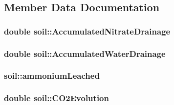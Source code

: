 \subsection{Member Data Documentation}
\hypertarget{classsoil_a92ba9cb92d2aebff24c21437ced70017}{
\subsubsection[{AccumulatedNitrateDrainage}]{\setlength{\rightskip}{0pt plus 5cm}double {\bf soil::AccumulatedNitrateDrainage}}}
\label{classsoil_a92ba9cb92d2aebff24c21437ced70017}
\hypertarget{classsoil_a8f203b5b85e7a616745ae8ec50e7f40d}{
\subsubsection[{AccumulatedWaterDrainage}]{\setlength{\rightskip}{0pt plus 5cm}double {\bf soil::AccumulatedWaterDrainage}}}
\label{classsoil_a8f203b5b85e7a616745ae8ec50e7f40d}
\hypertarget{classsoil_ad38099a7fb0f61aa85c082b4aa0ed931}{
\subsubsection[{ammoniumLeached}]{ {\bf soil::ammoniumLeached}}}
\label{classsoil_ad38099a7fb0f61aa85c082b4aa0ed931}
\hypertarget{classsoil_aca4597213bffd5e97041c7da8b41f009}{
\subsubsection[{CO2Evolution}]{\setlength{\rightskip}{0pt plus 5cm}double {\bf soil::CO2Evolution}}}
\label{classsoil_aca4597213bffd5e97041c7da8b41f009}
